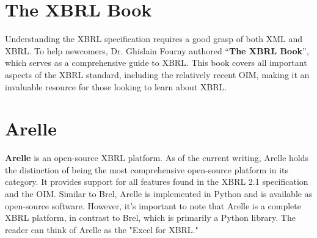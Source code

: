 \section{The XBRL Book}
Understanding the XBRL specification requires a good grasp of both XML and XBRL.
To help newcomers, Dr. Ghislain Fourny authored ``\textcolor{airforceblue}{\textbf{The XBRL Book}}''\cite{fourny2023xbrl},
which serves as a comprehensive guide to XBRL. This book covers all important aspects of the XBRL standard, including the relatively recent OIM, 
making it an invaluable resource for those looking to learn about XBRL.

\section{Arelle}
\textcolor{tropicalrainforest}{\textbf{Arelle}}\cite{arelle} 
is an open-source XBRL platform. 
As of the current writing, Arelle holds the distinction of being the most comprehensive open-source platform in its category. 
It provides support for all features found in the XBRL 2.1 specification and the OIM. 
Similar to Brel, Arelle is implemented in Python and is available as open-source software. 
However, it's important to note that Arelle is a complete XBRL platform, in contrast to Brel, which is primarily a Python library. 
The reader can think of Arelle as the "Excel for XBRL."

